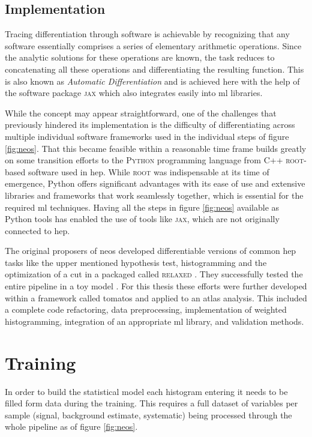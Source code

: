 \subsection{Implementation}
Tracing differentiation through software is achievable by recognizing that any software essentially comprises a series of elementary arithmetic operations. Since the analytic solutions for these operations are known, the task reduces to concatenating all these operations and differentiating the resulting function. This is also known as \textit{Automatic Differentiation} and is achieved here with the help of the software package \textsc{jax} \citep{jax2018github} which also  integrates easily into \ac{ml} libraries.

While the concept may appear straightforward, one of the challenges that previously hindered its implementation is the difficulty of differentiating across multiple individual software frameworks used in the individual steps of figure \ref{fig:neos}. That this became feasible within a reasonable time frame builds greatly on some transition efforts to the \textsc{Python} programming language from C++ \textsc{root}-based software \citep{ANTCHEVA20092499} used in \ac{hep}. While \textsc{root} was indispensable at its time of emergence, Python offers significant advantages with its ease of use and extensive libraries and frameworks that work seamlessly together, which is essential for the required \ac{ml} techniques. Having all the steps in figure \ref{fig:neos} available as Python tools has enabled the use of tools like \textsc{jax}, which are not originally connected to \ac{hep}.

The original proposers \citet{Simpson_2023} of \ac{neos} developed differentiable versions of common \ac{hep} tasks like the upper mentioned hypothesis test, histogramming and the optimization of a cut in a packaged called \textsc{relaxed} \citep{Simpson_relaxed_version_0_3_0_2023}. They successfully tested the entire pipeline in a toy model \citep{Simpson_neos_version_0_2_0_2021}. For this thesis these efforts were further developed within a framework called \ac{tomatos} \citep{tomatos} and applied to an \ac{atlas} analysis. This included a complete code refactoring, data preprocessing, implementation of weighted histogramming, integration of an appropriate \ac{ml} library, and validation methods.


\section{Training}
In order to build the statistical model each histogram entering it needs to be filled form data during the training. This requires a full dataset of variables per sample (signal, background estimate, systematic) being processed through the whole pipeline as of figure \ref{fig:neos}.

